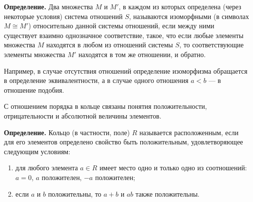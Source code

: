 \begin{rusblock}
\textbf{Определение.} Два множества $M$ и $M'$, в каждом из которых определена (через некоторые условия) система отношений $S$, называются изоморфными (в символах $M\cong M'$) относительно данной системы отношений, если между ними существует взаимно однозначное соответствие, такое, что если любые элементы множества $M$ находятся в любом из отношений системы $S$, то соответствующие элементы множества $M'$ находятся в том же отношении, и обратно.

Например, в случае отсутствия отношений определение изоморфизма обращается в определение эквивалентности, а в случае одного отношения $a<b$ --- в отношение подобия.
\end{rusblock}

\begin{rusblock}
С отношением порядка в кольце связаны понятия положительности, отрицательности и абсолютной величины элементов.

\textbf{Определение.} Кольцо (в частности, поле) $R$ называется расположенным, если для его элементов определено свойство быть положительным, удовлетворяющее следующим условиям:
\begin{enumerate}[leftmargin=2.2em]
\item для любого элемента $a\in R$ имеет место одно и только одно из соотношений: $a=0$, $a$ положителен, $-a$ положителен;
\item если $a$ и $b$ положительны, то $a+b$ и $ab$ также положительны.
\end{enumerate}
\end{rusblock}

